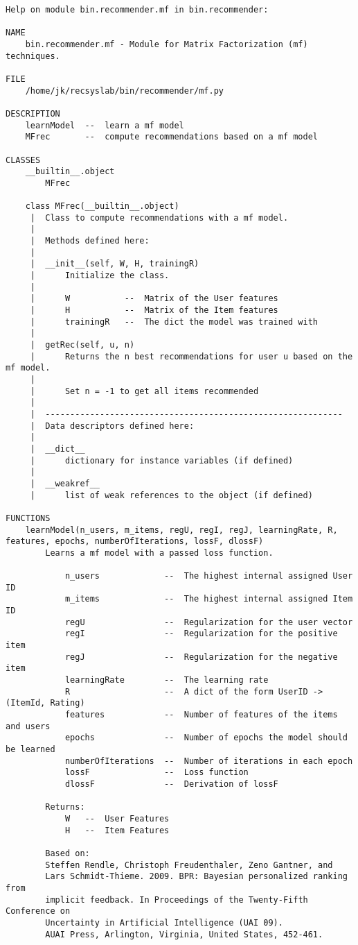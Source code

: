 \newpage
\begin{lstlisting}
Help on module bin.recommender.mf in bin.recommender:

NAME
    bin.recommender.mf - Module for Matrix Factorization (mf) techniques.

FILE
    /home/jk/recsyslab/bin/recommender/mf.py

DESCRIPTION
    learnModel  --  learn a mf model
    MFrec       --  compute recommendations based on a mf model

CLASSES
    __builtin__.object
        MFrec
    
    class MFrec(__builtin__.object)
     |  Class to compute recommendations with a mf model.
     |  
     |  Methods defined here:
     |  
     |  __init__(self, W, H, trainingR)
     |      Initialize the class.
     |      
     |      W           --  Matrix of the User features
     |      H           --  Matrix of the Item features
     |      trainingR   --  The dict the model was trained with
     |  
     |  getRec(self, u, n)
     |      Returns the n best recommendations for user u based on the mf model.
     |      
     |      Set n = -1 to get all items recommended
     |  
     |  ------------------------------------------------------------
     |  Data descriptors defined here:
     |  
     |  __dict__
     |      dictionary for instance variables (if defined)
     |  
     |  __weakref__
     |      list of weak references to the object (if defined)

FUNCTIONS
    learnModel(n_users, m_items, regU, regI, regJ, learningRate, R, features, epochs, numberOfIterations, lossF, dlossF)
        Learns a mf model with a passed loss function.
        
            n_users             --  The highest internal assigned User ID
            m_items             --  The highest internal assigned Item ID
            regU                --  Regularization for the user vector
            regI                --  Regularization for the positive item
            regJ                --  Regularization for the negative item
            learningRate        --  The learning rate
            R                   --  A dict of the form UserID -> (ItemId, Rating)
            features            --  Number of features of the items and users
            epochs              --  Number of epochs the model should be learned
            numberOfIterations  --  Number of iterations in each epoch
            lossF               --  Loss function
            dlossF              --  Derivation of lossF
        
        Returns:
            W   --  User Features
            H   --  Item Features
        
        Based on:
        Steffen Rendle, Christoph Freudenthaler, Zeno Gantner, and
        Lars Schmidt-Thieme. 2009. BPR: Bayesian personalized ranking from
        implicit feedback. In Proceedings of the Twenty-Fifth Conference on
        Uncertainty in Artificial Intelligence (UAI 09).
        AUAI Press, Arlington, Virginia, United States, 452-461.
\end{lstlisting}

